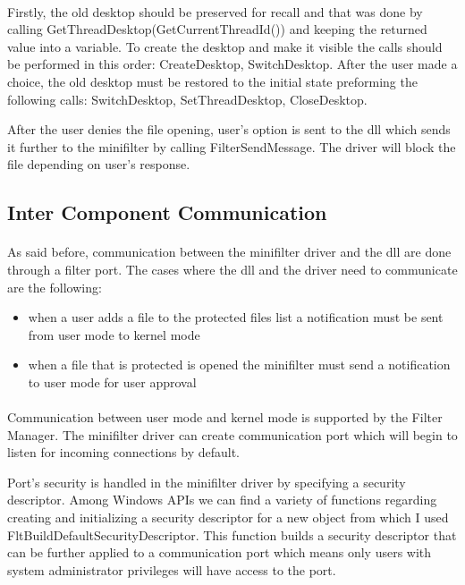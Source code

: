 		\paragraph{}
		Firstly, the old desktop should be preserved for recall and that was done by calling GetThreadDesktop(GetCurrentThreadId()) and keeping the returned value into a variable. To create the desktop and make it visible the calls should be performed in this order: CreateDesktop, SwitchDesktop. After the user made a choice, the old desktop must be restored to the initial state preforming the following calls: SwitchDesktop, SetThreadDesktop, CloseDesktop. 
		
		After the user denies the file opening, user's option is sent to the dll which sends it further to the minifilter by calling FilterSendMessage. The driver will block the file depending on user's response. 
	
	
		\subsection{Inter Component Communication}
		\paragraph{}
		As said before, communication between the minifilter driver and the dll are done through a filter port. The cases where the dll and the driver need to communicate are the following:
		\begin{itemize}
			\item when a user adds a file to the protected files list a notification must be sent from user mode to kernel mode
			\item when a file that is protected is opened the minifilter must send a notification to user mode for user approval
		\end{itemize}
			
		\paragraph{}
		Communication between user mode and kernel mode is supported by the Filter Manager. The minifilter driver can create communication port which will begin to listen for incoming connections by default. 
		
		Port's security is handled in the minifilter driver by specifying a security descriptor. Among  Windows APIs we can find a variety of functions regarding creating and initializing a security descriptor for a new object from which I used FltBuildDefaultSecurityDescriptor. This function builds a security descriptor that can be further applied to a communication port which means only users with system administrator privileges will have access to the port. \cite{MSDNCommunication}
		
